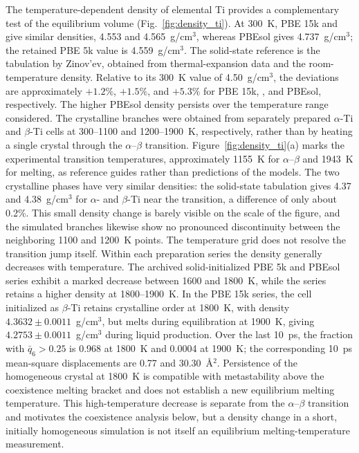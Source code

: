The temperature-dependent density of elemental Ti provides a complementary test of the equilibrium volume (Fig.~\ref{fig:density_ti}).
At 300~K, PBE 15k and \rscan{} give similar densities, 4.553 and 4.565~g/cm$^3$, whereas PBEsol gives 4.737~g/cm$^3$; the retained PBE 5k value is 4.559~g/cm$^3$.
The solid-state reference is the tabulation by Zinov'ev,\cite{Zinoviev1989} obtained from thermal-expansion data and the room-temperature density.
Relative to its 300~K value of 4.50~g/cm$^3$, the deviations are approximately $+1.2\%$, $+1.5\%$, and $+5.3\%$ for PBE 15k, \rscan{}, and PBEsol, respectively.
The higher PBEsol density persists over the temperature range considered.
The crystalline branches were obtained from separately prepared $\alpha$-Ti and $\beta$-Ti cells at 300--1100 and 1200--1900~K, respectively, rather than by heating a single crystal through the $\alpha$--$\beta$ transition.
Figure~\ref{fig:density_ti}(a) marks the experimental transition temperatures, approximately 1155~K for $\alpha$--$\beta$ and 1943~K for melting, as reference guides rather than predictions of the models.
The two crystalline phases have very similar densities: the solid-state tabulation gives 4.37 and 4.38~g/cm$^3$ for $\alpha$- and $\beta$-Ti near the transition, a difference of only about 0.2\%.
This small density change is barely visible on the scale of the figure, and the simulated branches likewise show no pronounced discontinuity between the neighboring 1100 and 1200~K points.
The temperature grid does not resolve the transition jump itself.
Within each preparation series the density generally decreases with temperature.
The archived solid-initialized PBE 5k and PBEsol series exhibit a marked decrease between 1600 and 1800~K, while the \rscan{} series retains a higher density at 1800--1900~K.
In the PBE 15k series, the cell initialized as $\beta$-Ti retains crystalline order at 1800~K, with density $4.3632\pm0.0011$~g/cm$^3$, but melts during equilibration at 1900~K, giving $4.2753\pm0.0011$~g/cm$^3$ during liquid production.
Over the last 10~ps, the fraction with $\bar q_6>0.25$ is 0.968 at 1800~K and 0.0004 at 1900~K; the corresponding 10~ps mean-square displacements are 0.77 and 30.30~\AA$^2$.
Persistence of the homogeneous crystal at 1800~K is compatible with metastability above the coexistence melting bracket and does not establish a new equilibrium melting temperature.
This high-temperature decrease is separate from the $\alpha$--$\beta$ transition and motivates the coexistence analysis below, but a density change in a short, initially homogeneous simulation is not itself an equilibrium melting-temperature measurement.

